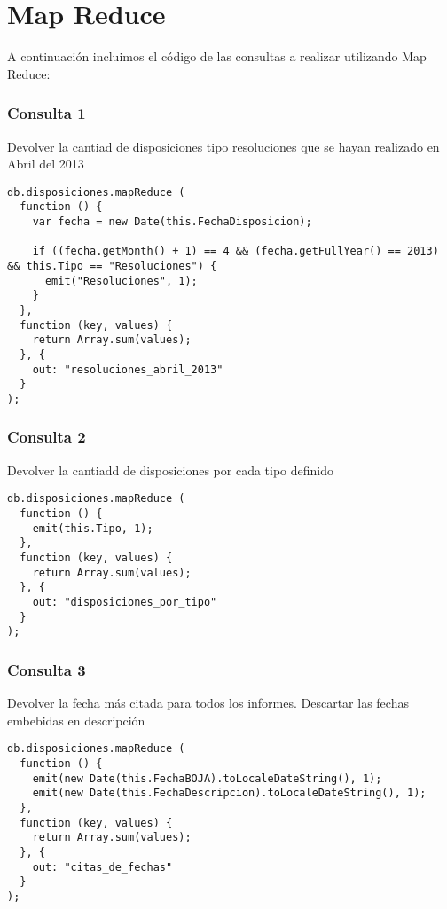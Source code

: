 \section{Map Reduce}

A continuaci\'on incluimos el c\'odigo de las consultas a realizar utilizando Map Reduce:

\subsubsection{Consulta 1}
Devolver la cantiad de disposiciones tipo resoluciones que se hayan realizado en Abril del 2013

\begin{lstlisting}
db.disposiciones.mapReduce (
  function () {
    var fecha = new Date(this.FechaDisposicion);

    if ((fecha.getMonth() + 1) == 4 && (fecha.getFullYear() == 2013) && this.Tipo == "Resoluciones") {
      emit("Resoluciones", 1);
    }
  },
  function (key, values) {
    return Array.sum(values);
  }, {
    out: "resoluciones_abril_2013"
  }
);
\end{lstlisting}

\subsubsection{Consulta 2}
Devolver la cantiadd de disposiciones por cada tipo definido

\begin{lstlisting}
db.disposiciones.mapReduce (
  function () {
    emit(this.Tipo, 1);
  },
  function (key, values) {
    return Array.sum(values);
  }, {
    out: "disposiciones_por_tipo"
  }
);
\end{lstlisting}

\subsubsection{Consulta 3}
Devolver la fecha m\'as citada para todos los informes. Descartar las fechas embebidas en descripci\'on

\begin{lstlisting}
db.disposiciones.mapReduce (
  function () {
    emit(new Date(this.FechaBOJA).toLocaleDateString(), 1);
    emit(new Date(this.FechaDescripcion).toLocaleDateString(), 1);
  },
  function (key, values) {
    return Array.sum(values);
  }, {
    out: "citas_de_fechas"
  }
);
\end{lstlisting}

